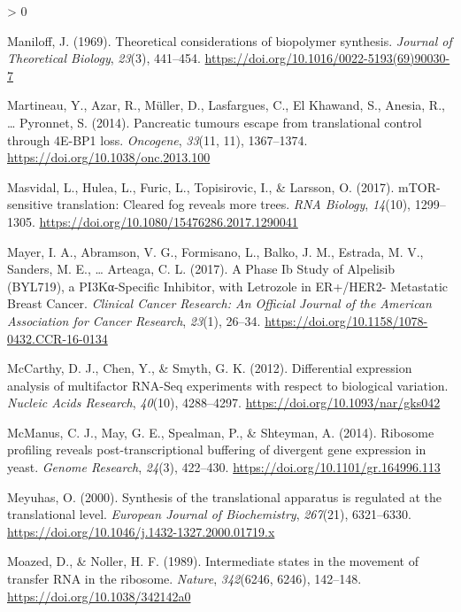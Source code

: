 \documentclass[
  12pt,
  openany]{book}
\newlength{\cslhangindent}
\newenvironment{CSLReferences}[2] %
 {%
  \setlength{\parindent}{0pt}
  \ifodd #1 \everypar{\setlength{\hangindent}{\cslhangindent}}\ignorespaces\fi
  \ifnum #2 > 0
  \setlength{\parskip}{#2\baselineskip}
  \fi
 }%
 {}
\begin{document}
\begin{CSLReferences}{1}{0}
\leavevmode\hypertarget{ref-Maniloff1969}{}%
Maniloff, J. (1969). Theoretical considerations of biopolymer synthesis. \emph{Journal of Theoretical Biology}, \emph{23}(3), 441--454. \url{https://doi.org/10.1016/0022-5193(69)90030-7}

\leavevmode\hypertarget{ref-Martineau2014}{}%
Martineau, Y., Azar, R., Müller, D., Lasfargues, C., El Khawand, S., Anesia, R., \ldots{} Pyronnet, S. (2014). Pancreatic tumours escape from translational control through {4E}-{BP1} loss. \emph{Oncogene}, \emph{33}(11, 11), 1367--1374. \url{https://doi.org/10.1038/onc.2013.100}

\leavevmode\hypertarget{ref-Masvidal2017}{}%
Masvidal, L., Hulea, L., Furic, L., Topisirovic, I., \& Larsson, O. (2017). {mTOR}-sensitive translation: {Cleared} fog reveals more trees. \emph{RNA Biology}, \emph{14}(10), 1299--1305. \url{https://doi.org/10.1080/15476286.2017.1290041}

\leavevmode\hypertarget{ref-Mayer2017}{}%
Mayer, I. A., Abramson, V. G., Formisano, L., Balko, J. M., Estrada, M. V., Sanders, M. E., \ldots{} Arteaga, C. L. (2017). A {Phase Ib Study} of {Alpelisib} ({BYL719}), a {PI3Kα}-{Specific Inhibitor}, with {Letrozole} in {ER}+/{HER2}- {Metastatic Breast Cancer}. \emph{Clinical Cancer Research: An Official Journal of the American Association for Cancer Research}, \emph{23}(1), 26--34. \url{https://doi.org/10.1158/1078-0432.CCR-16-0134}

\leavevmode\hypertarget{ref-McCarthy2012}{}%
McCarthy, D. J., Chen, Y., \& Smyth, G. K. (2012). Differential expression analysis of multifactor {RNA}-{Seq} experiments with respect to biological variation. \emph{Nucleic Acids Research}, \emph{40}(10), 4288--4297. \url{https://doi.org/10.1093/nar/gks042}

\leavevmode\hypertarget{ref-McManus2014}{}%
McManus, C. J., May, G. E., Spealman, P., \& Shteyman, A. (2014). Ribosome profiling reveals post-transcriptional buffering of divergent gene expression in yeast. \emph{Genome Research}, \emph{24}(3), 422--430. \url{https://doi.org/10.1101/gr.164996.113}

\leavevmode\hypertarget{ref-Meyuhas2000}{}%
Meyuhas, O. (2000). Synthesis of the translational apparatus is regulated at the translational level. \emph{European Journal of Biochemistry}, \emph{267}(21), 6321--6330. \url{https://doi.org/10.1046/j.1432-1327.2000.01719.x}

\leavevmode\hypertarget{ref-Moazed1989}{}%
Moazed, D., \& Noller, H. F. (1989). Intermediate states in the movement of transfer {RNA} in the ribosome. \emph{Nature}, \emph{342}(6246, 6246), 142--148. \url{https://doi.org/10.1038/342142a0}


\end{CSLReferences}
\end{document}
